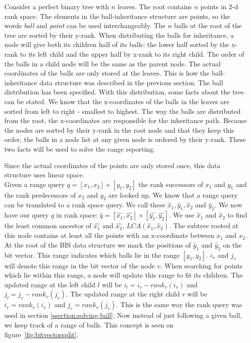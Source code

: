 Consider a perfect binary tree with $n$ leaves. The root contains $n$ points in $2$-d rank space. The elements in the ball-inheritance structure are points, so the words \emph{ball} and \emph{point} can be used interchangeably. The $n$ balls at the root of the tree are sorted by their y-rank. When distributing the balls for inheritance, a node will give both its children half of its balls: the lower half sorted by the x-rank to its left child and the upper half by x-rank to its right child. The order of the balls in a child node will be the same as the parent node. The actual coordinates of the balls are only stored at the leaves. This is how the ball-inheritance data structure was described in the previous section. The ball distribution has been specified. With this distribution, some facts about the tree can be stated. We know that the x-coordinates of the balls in the leaves are sorted from left to right - smallest to highest. The way the balls are distributed from the root, the x-coordinates are responsible for the inheritance path. Because the nodes are sorted by their y-rank in the root node and that they keep this order, the balls in a node list at any given node is ordered by their y-rank. These two facts will be used to solve the range reporting.

\noindent Since the actual coordinates of the points are only stored once, this data structure uses linear space. \\

Given a range query $q = [x_1, x_2] \times [y_1, y_2]$ the rank successors of $x_1$ and $y_1$ and the rank predecessors of $x_2$ and $y_2$ are looked up. We know that a range query can be translated to a rank space query. We call these $\hat{x}_1, \hat{y}_1, \hat{x}_2$ and $\hat{y}_2$. We now have our query $q$ in rank space: $\hat{q} = [\hat{x_1}, \hat{x_2}] \times [\hat{y_1}, \hat{y_2}]$. We use $\hat{x}_1$ and $\hat{x}_2$ to find the least common ancestor of $\hat{x_1}$ and $\hat{x_2}$, $LCA(\hat{x}_1, \hat{x}_2)$. The subtree rooted at this node contains at least all the points with an x-coordinate between $x_1$ and $x_2$. \\

At the root of the BIS data structure we mark the positions of $\hat{y}_1$ and $\hat{y}_2$ on the bit vector. This range indicates which balls lie in the range $[y_1, y_2]$. $i_v$ and $j_v$ will denote this range in the bit vector of the node $v$. When searching for points which lie within this range, a node will update this range to fit its children. The updated range at the left child $l$ will be $i_l = i_v - rank_v(i_v)$ and $j_l = j_v - rank_v(j_v)$. The updated range at the right child $r$ will be $i_r = rank_v(i_v)$ and $j_r = rank_v(j_v)$. This is the same way the rank query was used in section \ref{ssection:solving-ball}. Now instead of just following a given ball, we keep track of a range of balls. This concept is seen on figure~\ref{fig:bitvectorsplit}. \\

